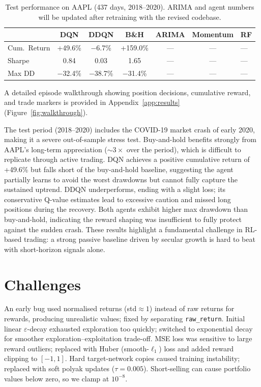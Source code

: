 \documentclass[11pt,twocolumn]{article}
\begin{document}
\begin{table}[H]
\centering
\caption{Test performance on AAPL (437 days, 2018--2020). ARIMA and agent numbers will be updated after retraining with the revised codebase.}
\label{tab:results}
\begin{tabular}{lccccc}
\toprule
 & \textbf{DQN} & \textbf{DDQN} & \textbf{B\&H} & \textbf{ARIMA} & \textbf{Momentum} & \textbf{RF} \\
\midrule
Cum.\ Return   & +49.6\%   & $-$6.7\%  & +159.0\% & --- & --- & --- \\
Sharpe          & 0.84      & 0.03      & 1.65     & --- & --- & --- \\
Max DD          & $-$32.4\% & $-$38.7\% & $-$31.4\% & --- & --- & --- \\
\bottomrule
\end{tabular}
\end{table}

A detailed episode walkthrough showing position decisions, cumulative reward, and trade markers is provided in Appendix~\ref{app:results} (Figure~\ref{fig:walkthrough}).

The test period (2018--2020) includes the COVID-19 market crash of early 2020, making it a severe out-of-sample stress test.
Buy-and-hold benefits strongly from AAPL's long-term appreciation (${\sim}3\times$ over the period), which is difficult to replicate through active trading.
DQN achieves a positive cumulative return of +49.6\% but falls short of the buy-and-hold baseline, suggesting the agent partially learns to avoid the worst drawdowns but cannot fully capture the sustained uptrend.
DDQN underperforms, ending with a slight loss; its conservative Q-value estimates lead to excessive caution and missed long positions during the recovery.
Both agents exhibit higher max drawdown than buy-and-hold, indicating the reward shaping was insufficient to fully protect against the sudden crash.
These results highlight a fundamental challenge in RL-based trading: a strong passive baseline driven by secular growth is hard to beat with short-horizon signals alone.

\section{Challenges}

An early bug used normalised returns (std${\approx}1$) instead of raw returns for rewards, producing unrealistic values; fixed by separating \texttt{raw\_return}.
Initial linear $\varepsilon$-decay exhausted exploration too quickly; switched to exponential decay for smoother exploration–exploitation trade-off.
MSE loss was sensitive to large reward outliers; replaced with Huber (smooth-$\ell_1$) loss and added reward clipping to $[-1,1]$.
Hard target-network copies caused training instability; replaced with soft polyak updates ($\tau{=}0.005$).
Short-selling can cause portfolio values below zero, so we clamp at $10^{-8}$.
\end{document}
